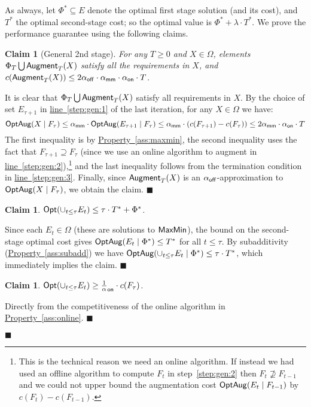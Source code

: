 \documentclass[11pt,letterpaper]{article}
\newcommand{\lref}[2][]{\hyperref[#2]{#1~\ref*{#2}}}
\newtheorem{claim}[theorem]{Claim}
\newenvironment{Myquote}{\par\begingroup
\addtolength{\leftskip}{1em} \rightskip\leftskip }{\par
\endgroup
}
\newenvironment{proof}{

\noindent{\bf Proof:}} {\hfill$\blacksquare$


}
\def\opt{{\sf Opt}\xspace}
\def\mm{{\sf MaxMin}\xspace}
\def\fst{\ensuremath {\Phi_T}\xspace}
\def\snd{\ensuremath {{\sf Augment}_T}\xspace}
\newcommand{\sse}{\subseteq}
\newcommand{\offline}{\alpha_{\sf off}}
\newcommand{\online}{\alpha_{\sf on}}
\newcommand{\optaug}{{\sf OptAug}}
\newcounter{note}[section]
\newcommand{\Tstar}{\ensuremath{T^*}\xspace}
\newcommand{\Phistar}{\ensuremath{\Phi^*}\xspace}
\begin{document}
\begin{proof}
As always, let $\Phistar \sse E$ denote the optimal first stage solution (and its cost), and $\Tstar$ the optimal
  second-stage cost; so the optimal value is $\Phistar+\lambda\cdot \Tstar$. We prove the
  performance guarantee using the following claims.
\begin{Myquote}
\begin{claim}[General 2nd stage]\label{cl:p1}
For any $T\ge 0$ and $X\in\Omega$, elements $\fst\bigcup \snd(X)$ satisfy all the requirements in $X$, and
  $c(\snd(X))\le 2\offline\cdot \mapx\cdot \online\cdot T$.
\end{claim}
\begin{proof}
It is clear that $\fst\bigcup \snd(X)$ satisfy all requirements in $X$. By the choice of set $E_{\tau+1}$ in
\lref[line]{step:gen:1} of the last iteration, for any $X\in\Omega$ we have:
$$\optaug(X\mid F_\tau)\le \mapx\cdot \optaug(E_{\tau+1}\mid F_\tau)\le \mapx\cdot \left( c(F_{\tau+1}) -
c(F_{\tau})\right)\le 2\mapx\cdot \online\cdot T$$ The first inequality is by \lref[Property]{ass:maxmin}, the second
inequality uses the fact that $F_{\tau+1}\supseteq F_\tau$ (since we use an online algorithm to augment in
\lref[line]{step:gen:2}),\footnote{This is the technical reason we need an online algorithm. If instead we had used an
offline algorithm to compute $F_t$ in step~\ref{step:gen:2} then $F_t\not\supseteq F_{t-1}$ and we could not upper
bound the augmentation cost $\optaug(E_t\mid F_{t-1})$ by $c(F_t)-c(F_{t-1})$.} and the last inequality follows from
the termination condition in \lref[line]{step:gen:3}. Finally, since $\snd(X)$ is an $\offline$-approximation to
$\optaug(X\mid F_\tau)$, we obtain the claim.
\end{proof}

\begin{claim}\label{cl:p2}
$\opt(\cup_{t\le \tau} E_t)\le \tau\cdot \Tstar+ \Phistar$.
\end{claim}
\begin{proof}
Since each $E_t\in \Omega$ (these are solutions to $\mm$), the bound on the second-stage optimal cost gives
$\optaug(E_t\mid \Phistar)\le \Tstar$ for all $t\le \tau$. By subadditivity (\lref[Property]{ass:subadd}) we have
$\optaug(\cup_{t\le \tau} E_t\mid \Phistar)\le \tau\cdot \Tstar$, which immediately implies the claim.
\end{proof}

\begin{claim}\label{cl:p3}
$\opt(\cup_{t\le \tau} E_t)\ge \frac1\online \cdot c(F_\tau)$.
\end{claim}
\begin{proof}
Directly from the competitiveness of the online algorithm in \lref[Property]{ass:online}.
\end{proof}


\end{Myquote}
\end{proof}
\end{document}
